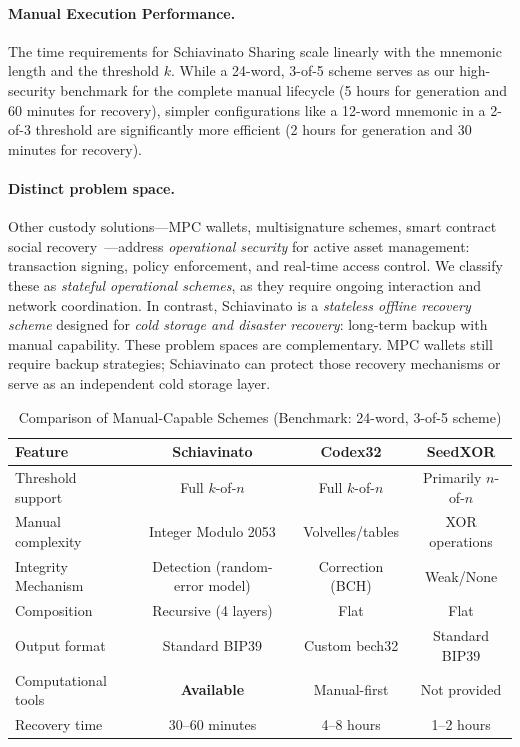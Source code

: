 \documentclass[11pt]{article}
\begin{document}
\paragraph{Manual Execution Performance.} The time requirements for Schiavinato Sharing scale linearly with the mnemonic length and the threshold $k$. While a 24-word, 3-of-5 scheme serves as our high-security benchmark for the complete manual lifecycle (5 hours for generation and 60 minutes for recovery), simpler configurations like a 12-word mnemonic in a 2-of-3 threshold are significantly more efficient (2 hours for generation and 30 minutes for recovery).

\paragraph{Distinct problem space.} Other custody solutions---MPC wallets, multisignature schemes, smart contract social recovery~\cite{buterin}---address \textit{operational security} for active asset management: transaction signing, policy enforcement, and real-time access control. We classify these as \textit{stateful operational schemes}, as they require ongoing interaction and network coordination. In contrast, Schiavinato is a \textit{stateless offline recovery scheme} designed for \textit{cold storage and disaster recovery}: long-term backup with manual capability. These problem spaces are complementary. MPC wallets still require backup strategies; Schiavinato can protect those recovery mechanisms or serve as an independent cold storage layer.

\begin{table}[t]
\centering
\caption{Comparison of Manual-Capable Schemes (Benchmark: 24-word, 3-of-5 scheme)}
\label{tab:manual}
\small
\begin{tabular}{@{}lccc@{}}
\toprule
\textbf{Feature} & \textbf{Schiavinato} & \textbf{Codex32} & \textbf{SeedXOR} \\ \midrule
Threshold support & Full $k$-of-$n$ & Full $k$-of-$n$ & Primarily $n$-of-$n$ \\
Manual complexity & Integer Modulo 2053 & Volvelles/tables & XOR operations \\
Integrity Mechanism & Detection (random-error model) & Correction (BCH) & Weak/None \\
Composition & Recursive (4 layers) & Flat & Flat \\
Output format & Standard BIP39 & Custom bech32 & Standard BIP39 \\
Computational tools & \textbf{Available} & Manual-first & Not provided \\
Recovery time & 30--60 minutes & 4--8 hours & 1--2 hours \\
\bottomrule
\end{tabular}
\end{table}
\end{document}
